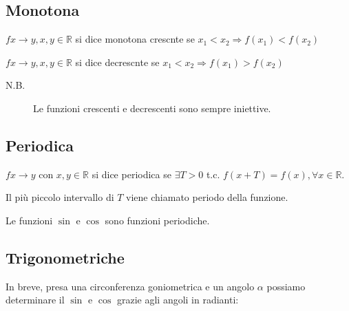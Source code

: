 \subsection*{Monotona}
\begin{definition}[Crescente]
    $fx\rightarrow y, x,y\in\mathbb{R}$ si dice monotona crescnte se $x_1<x_2\Rightarrow f(x_1)<f(x_2)$
\end{definition}


\begin{definition}[Descrescente]
    $fx\rightarrow y, x,y\in\mathbb{R}$ si dice decrescnte se $x_1<x_2\Rightarrow f(x_1)>f(x_2)$    
\end{definition}


\begin{description}
		\item[N.B.]  Le funzioni crescenti e decrescenti sono sempre iniettive.
\end{description}

\subsection*{Periodica}
\begin{definition}[Periodica]
    $fx\rightarrow y$ con $x,y\in\mathbb{R}$ si dice periodica se $\exists T>0$ t.c. $f(x+T)=f(x), \forall x\in\mathbb{R}$.
\end{definition}
Il più piccolo intervallo di $T$ viene chiamato periodo della funzione.

Le funzioni $\sin$ e $\cos$ sono funzioni periodiche.

\subsection*{Trigonometriche}
In breve, presa una circonferenza goniometrica e un angolo $\alpha$ possiamo determinare il $\sin$ e $\cos$ grazie agli angoli in radianti:

